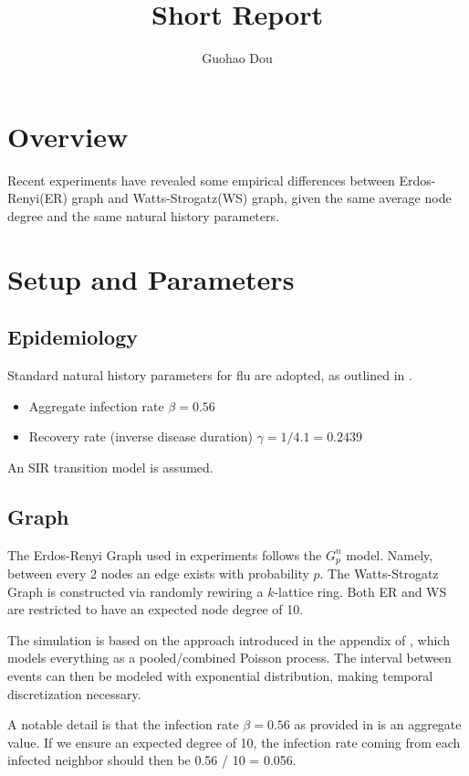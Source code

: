 \documentclass[12pt]{article}
\theoremstyle{definition}
\begin{document}
 
\title{Short Report}
\author{Guohao Dou}
\maketitle

\section{Overview}
Recent experiments have revealed some empirical differences between Erdos-Renyi(ER) graph and Watts-Strogatz(WS) graph, given the same average node degree and the same natural history parameters. 

\section{Setup and Parameters}
\subsection{Epidemiology}
Standard natural history parameters for flu are adopted, as outlined in \cite{roosa2019assessing}. 
\begin{itemize}
    \item Aggregate infection rate $\beta = 0.56$
    \item Recovery rate (inverse disease duration) $\gamma = 1/4.1 = 0.2439$
\end{itemize}

An SIR transition model is assumed. 

\subsection{Graph}
The Erdos-Renyi Graph used in experiments follows the $G^n_p$ model. Namely, between every 2 nodes an edge exists with probability $p$. The Watts-Strogatz Graph is constructed via randomly rewiring a $k$-lattice ring. Both ER and WS are restricted to have an expected node degree of 10. 

The simulation is based on the approach introduced in the appendix of \cite{kiss2017mathematics}, which models everything as a pooled/combined Poisson process. The interval between events can then be modeled with exponential distribution, making temporal discretization necessary. 

A notable detail is that the infection rate $\beta=0.56$ as provided in \cite{roosa2019assessing} is an aggregate value. If we ensure an expected degree of 10, the infection rate coming from each infected neighbor should then be 0.56 / 10 = 0.056. 
\end{document}
